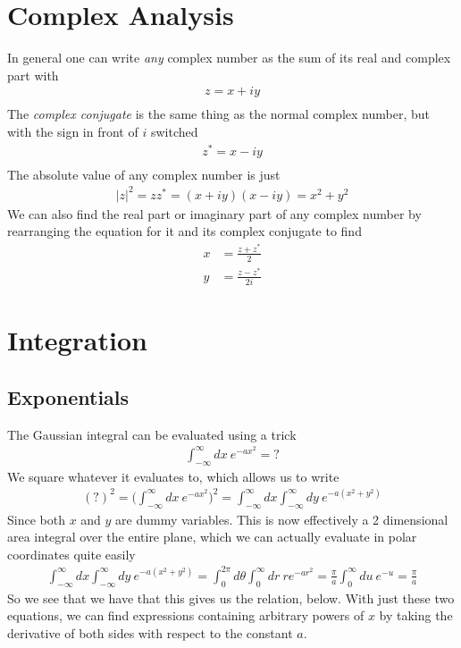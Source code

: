 \section{Complex Analysis}
In general one can write \emph{any} complex number as the sum of its real and complex part with
\begin{align}
	z = x + iy\\
\end{align}	
	The \emph{complex conjugate} is the same thing as the normal complex number, but with the sign in front of  $i$ switched
\begin{align}
	z^* = x - iy\\
\end{align}
The absolute value of any complex number is just
\begin{align}
	|z|^2 = zz^* = (x+iy)(x-iy) = x^2 +y^2
\end{align}
We can also find the real part  or imaginary part of any complex number by rearranging the equation for it and its complex conjugate to find
\begin{align}
	x &= \frac{z+z^*}{2}\\
	y &= \frac{z - z^*}{2i}
\end{align}






\section{Integration}



\subsection{Exponentials}
The Gaussian integral can be evaluated using a trick
\begin{align}
	\int_{-\infty}^\infty dx~e^{-ax^2} = ?
\end{align}
We square whatever it evaluates to, which allows us to write
\begin{align}
	(?)^2 = \Big(\int_{-\infty}^\infty dx~e^{-ax^2}\Big)^2 = \int_{-\infty}^\infty dx \int_{-\infty}^\infty dy~e^{-a(x^2+y^2)}
\end{align}
Since both $x$ and $y$ are dummy variables. This is now effectively a 2 dimensional area integral over the entire plane, which we can actually evaluate in polar coordinates quite easily
\begin{align}
	\int_{-\infty}^\infty dx \int_{-\infty}^\infty dy~e^{-a(x^2+y^2)} = \int_0^{2\pi} d\theta \int_0^\infty dr~re^{-ar^2} = \frac{\pi}{a} \int_0^\infty du~ e^{-u} = \frac{\pi}{a}
\end{align}
So we see that we have that this gives us the relation, below. With just these two equations, we can find expressions containing arbitrary powers of $x$ by taking the derivative of both sides with respect to the constant $a$.

